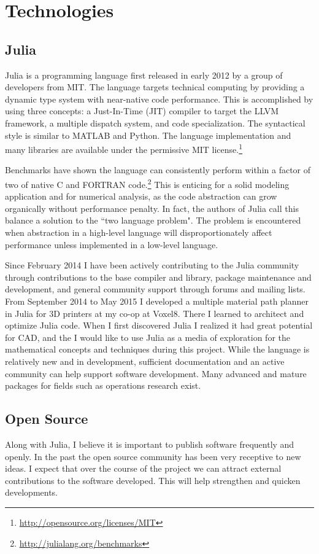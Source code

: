 \documentclass[a4paper]{article}
\begin{document}
\section{Technologies}
\subsection{Julia}
Julia is a programming language first released in early 2012 by a group of developers from MIT. The language targets technical computing by providing a dynamic type system with near-native code performance. This is accomplished by using three concepts: a Just-In-Time (JIT) compiler to target the LLVM framework, a multiple dispatch system, and code specialization.\cite{bezanson2012julia} The syntactical style is similar to MATLAB and Python. The language implementation and many libraries are available under the permissive MIT license.\footnote{\url{http://opensource.org/licenses/MIT}}

Benchmarks have shown the language can consistently perform within a factor of two of native C and FORTRAN code.\footnote{\url{http://julialang.org/benchmarks}} This is enticing for a solid modeling application and for numerical analysis, as the code abstraction can grow organically without performance penalty. In fact, the authors of Julia call this balance a solution to the ``two language problem". The problem is encountered when abstraction in a high-level language will disproportionately affect performance unless implemented in a low-level language. 

Since February 2014 I have been actively contributing to the Julia community through contributions to the base compiler and library, package maintenance and development, and general community support through forums and mailing lists. From September 2014 to May 2015 I developed a multiple material path planner in Julia for 3D printers at my co-op at Voxel8. There I learned to architect and optimize Julia code. When I first discovered Julia I realized it had great potential for CAD, and the
I would like to use Julia as a media of exploration for the mathematical concepts and techniques during this project. While the language is relatively new and in development, sufficient documentation and an active community can help support software development. Many advanced and mature packages for fields such as operations research exist.\cite{lubin2013computing}


\subsection{Open Source}
Along with Julia, I believe it is important to publish software frequently and openly. In the past the open source community has been very receptive to new ideas. I expect that over the course of the project we can attract external contributions to the software developed. This will help strengthen and quicken developments.
\end{document}
